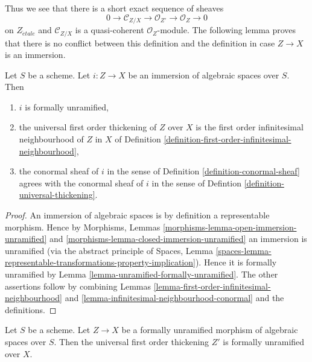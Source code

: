 \noindent
Thus we see that there is a short exact sequence of sheaves
$$
0 \to \mathcal{C}_{Z/X} \to \mathcal{O}_{Z'} \to \mathcal{O}_Z \to 0
$$
on $Z_{\acute{e}tale}$ and $\mathcal{C}_{Z/X}$ is a quasi-coherent
$\mathcal{O}_Z$-module. The following lemma proves that there is no
conflict between this definition and the definition in case $Z \to X$
is an immersion.

\begin{lemma}
\label{lemma-immersion-universal-thickening}
Let $S$ be a scheme.
Let $i : Z \to X$ be an immersion of algebraic spaces over $S$. Then
\begin{enumerate}
\item $i$ is formally unramified,
\item the universal first order thickening of $Z$ over $X$ is the first order
infinitesimal neighbourhood of $Z$ in $X$ of
Definition \ref{definition-first-order-infinitesimal-neighbourhood},
\item the conormal sheaf of $i$ in the sense of
Definition \ref{definition-conormal-sheaf}
agrees with the conormal sheaf of $i$ in the sense of
Defintion \ref{definition-universal-thickening}.
\end{enumerate}
\end{lemma}

\begin{proof}
An immersion of algebraic spaces is by definition a representable morphism.
Hence by
Morphisms, Lemmas \ref{morphisms-lemma-open-immersion-unramified} and
\ref{morphisms-lemma-closed-immersion-unramified}
an immersion is unramified (via the abstract principle of
Spaces, Lemma
\ref{spaces-lemma-representable-transformations-property-implication}).
Hence it is formally unramified by
Lemma \ref{lemma-unramified-formally-unramified}.
The other assertions follow by combining
Lemmas \ref{lemma-first-order-infinitesimal-neighbourhood} and
\ref{lemma-infinitesimal-neighbourhood-conormal}
and the definitions.
\end{proof}

\begin{lemma}
\label{lemma-universal-thickening-unramfied}
Let $S$ be a scheme.
Let $Z \to X$ be a formally unramified morphism of algebraic spaces over $S$.
Then the universal first order thickening $Z'$ is formally
unramified over $X$.
\end{lemma}

